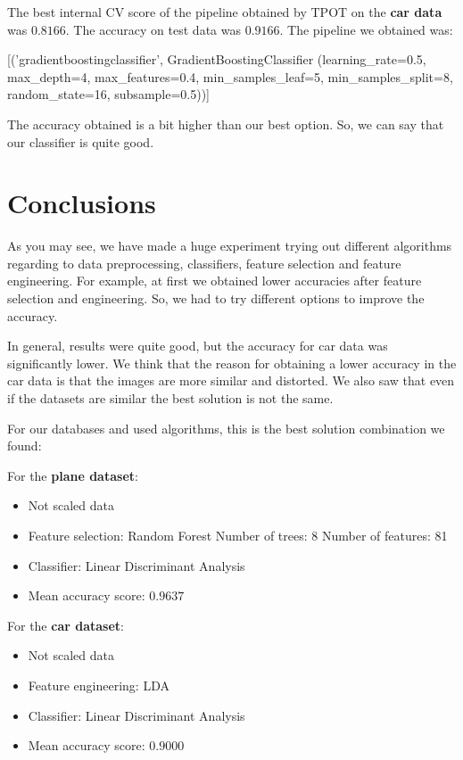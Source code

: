 \documentclass{article} %
\begin{document}
The best internal CV score of the pipeline obtained by TPOT on the \textbf{car data} was $0.8166$. The accuracy on test data was $0.9166$. The pipeline we obtained was: 

[('gradientboostingclassifier',
  GradientBoostingClassifier (learning\_rate=0.5, max\_depth=4, max\_features=0.4,
                             min\_samples\_leaf=5, min\_samples\_split=8,
                             random\_state=16, subsample=0.5))]

The accuracy obtained is a bit higher than our best option. So, we can say that our classifier is quite good.

\section{Conclusions}

As you may see, we have made a huge experiment trying out different algorithms regarding to data preprocessing, classifiers, feature selection and feature engineering. For example, at first we obtained lower accuracies after feature selection and engineering. So, we had to try different options to improve the accuracy. 

In general, results were quite good, but the accuracy for car data was significantly lower. We think that the reason for obtaining a lower accuracy in the car data is that the images are more similar and distorted. We also saw that even if the datasets are similar the best solution is not the same.

For our databases and used algorithms, this is the best solution combination we found:

For the \textbf{plane dataset}:
\begin{itemize}
    \item Not scaled data
    \item Feature selection: Random Forest
    \subitem Number of trees: 8
    \subitem Number of features: 81
    \item Classifier: Linear Discriminant Analysis
    \item Mean accuracy score: $0.9637$
\end{itemize}

For the \textbf{car dataset}:
\begin{itemize}
    \item Not scaled data
    \item Feature engineering: LDA
    \item Classifier: Linear Discriminant Analysis
    \item Mean accuracy score: $0.9000$
\end{itemize}



\end{document}
